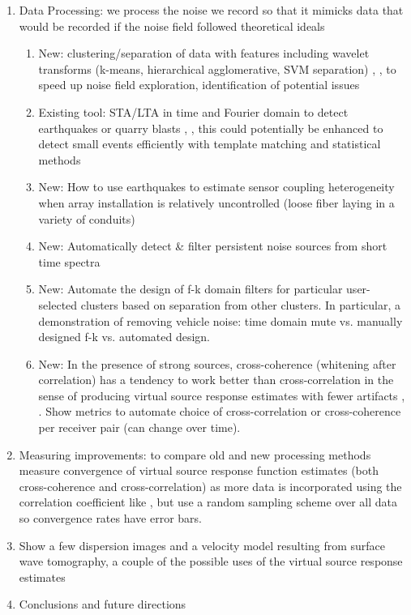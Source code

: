 \documentclass[11pt]{article}
\begin{document}
\begin{enumerate}
	\vspace{-0.4cm}
	\item Data Processing: we process the noise we record so that it mimicks data that would be recorded if the noise field followed theoretical ideals \cite{Bensen2007}
		\begin{enumerate}
		\vspace{-0.3cm}
		\item New: clustering/separation of data with features including wavelet transforms (k-means, hierarchical agglomerative, SVM separation) \cite{Liao2005}, \cite{Hastie2009}, \cite{Mallat2008} to speed up noise field exploration, identification of potential issues
		\vspace{-0.1cm}
		\item Existing tool: STA/LTA \cite{Withers1998} in time and Fourier domain to detect earthquakes or quarry blasts \cite{Bensen2007}, \cite{Girard2016}, this could potentially be enhanced to detect small events efficiently with template matching and statistical methods \cite{Yoon2015}
		\vspace{-0.1cm}
		\item New: How to use earthquakes to estimate sensor coupling heterogeneity when array installation is relatively uncontrolled (loose fiber laying in a variety of conduits) 
		\vspace{-0.1cm}
		\item New: Automatically detect \& filter persistent noise sources from short time spectra
		\vspace{-0.1cm}
		\item New: Automate the design of f-k domain filters for particular user-selected clusters based on separation from other clusters. In particular, a demonstration of removing vehicle noise: time domain mute vs. manually designed f-k vs. automated design. 
		\vspace{-0.1cm}
		\item New: In the presence of strong sources, cross-coherence (whitening after correlation) has a tendency to work better than cross-correlation in the sense of producing virtual source response estimates with fewer artifacts \cite{Nakata2011}, \cite{Martin2016}. Show metrics to automate choice of cross-correlation or cross-coherence per receiver pair (can change over time).
		\end{enumerate}
	\vspace{-0.5cm}
	\item Measuring improvements: to compare old and new processing methods measure convergence of virtual source response function estimates (both cross-coherence and cross-correlation) as more data is incorporated using the correlation coefficient like \cite{Seats2012}, but use a random sampling scheme over all data so convergence rates have error bars.
	\vspace{-0.3cm}
	\item Show a few dispersion images and a velocity model resulting from surface wave tomography, a couple of the possible uses of the virtual source response estimates
	\vspace{-0.3cm}
	\item Conclusions and future directions
	\end{enumerate}
\end{document}
